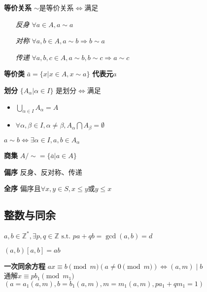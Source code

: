 \documentclass[a4paper,10pt]{ctexart}
\newcommand*{\setZ}{\mathbb{Z}}
\newcommand*{\st}{\text{ s.t. }}
\newcommand*{\impl}{\Rightarrow}
\renewcommand*{\iff}{\Leftrightarrow}
\renewcommand*{\leq}{\leqslant}
\begin{document}
\begin{multicols}{3}
    \textbf{等价关系} $\sim$是等价关系$\iff$满足

    \begin{itemize}
        \item[\emph{反身}] $\forall a \!\in\! A, a \sim a$
        \item[\emph{对称}] $\forall a, b \!\in\! A, a \sim b \impl b \sim a$
        \item[\emph{传递}] $\forall a, b, c \!\in\! A, a \sim b, b \sim c \impl a \sim c $
    \end{itemize}

    \textbf{等价类} $\bar{a} = \{ x | x \in A, x \sim a \}$ \textbf{代表元}$a$

    \textbf{划分} $\{ A_\alpha | \alpha \in I \}$ 是划分$\iff$满足

    \begin{itemize}
        \item $\bigcup\limits_{\alpha \in I} A_\alpha = A$
        \item $\forall \alpha, \beta \in I, \alpha \ne \beta, A_\alpha \bigcap A_\beta = \emptyset$
    \end{itemize}

    \begin{theorem}[等价与划分]
        $a \sim b \iff \exists \alpha \in I, a, b \in A_\alpha$
    \end{theorem}

    \textbf{商集} $A/\sim = \{ \bar{a} | a \in A \}$

    \textbf{偏序} 反身、反对称、传递

    \textbf{全序} 偏序且$\forall x, y \in S, x \leq y$或$y \leq x$

    \subsection{整数与同余}

    \begin{theorem}[Bézout定理]
        $a, b \in \setZ^*, \exists p, q \in \setZ \st pa + qb = \gcd(a, b) = d$
    \end{theorem}

    \begin{theorem}
        $(a, b)[a, b] = ab$
    \end{theorem}

    \textbf{一次同余方程} $ax \equiv b \pmod{m} (a \ne 0 \pmod{m}) \iff (a, m) \mid b$\\
    通解$x \equiv pb_1 \pmod{m_1}$ $(a = a_1(a, m), b = b_1(a, m), m = m_1(a, m), pa_1 +qm_1 = 1)$


\end{multicols}
\end{document}
